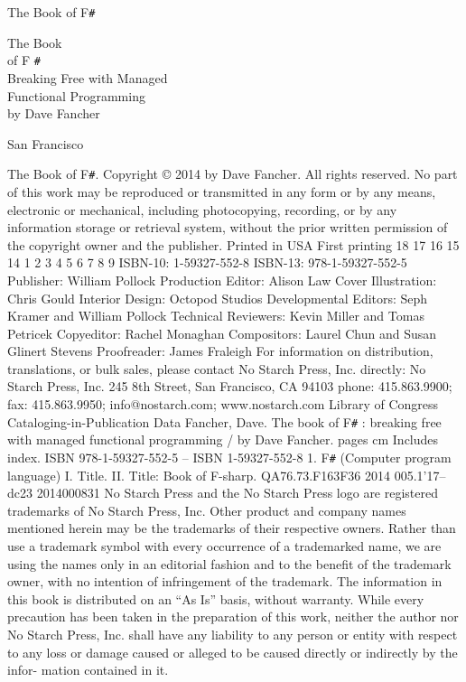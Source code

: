 \documentclass{book}
\begin{document}
The Book of F\verb|#|


\centering
{\Huge The Book \\of F \verb|#|\\}
{\large Breaking Free with Managed \\Functional Programming}
\\
{\large by Dave Fancher\\}


San Francisco

The Book of F\verb|#|. Copyright © 2014 by Dave Fancher.
All rights reserved. No part of this work may be reproduced or transmitted in any form or by any means, electronic
or mechanical, including photocopying, recording, or by any information storage or retrieval system, without the
prior written permission of the copyright owner and the publisher.
Printed in USA
First printing
18 17 16 15 14   1 2 3 4 5 6 7 8 9
ISBN-10: 1-59327-552-8
ISBN-13: 978-1-59327-552-5
Publisher: William Pollock
Production Editor: Alison Law
Cover Illustration: Chris Gould
Interior Design: Octopod Studios
Developmental Editors: Seph Kramer and William Pollock
Technical Reviewers: Kevin Miller and Tomas Petricek
Copyeditor: Rachel Monaghan
Compositors: Laurel Chun and Susan Glinert Stevens
Proofreader: James Fraleigh
For information on distribution, translations, or bulk sales, please contact No Starch Press, Inc. directly:
No Starch Press, Inc.
245 8th Street, San Francisco, CA 94103
phone: 415.863.9900; fax: 415.863.9950; info@nostarch.com; www.nostarch.com
Library of Congress Cataloging-in-Publication Data
Fancher, Dave.
The book of F\verb|#| : breaking free with managed functional programming / by Dave Fancher.
pages cm
Includes index.
ISBN 978-1-59327-552-5 -- ISBN 1-59327-552-8
1. F\verb|#| (Computer program language) I. Title. II. Title: Book of F-sharp.
QA76.73.F163F36 2014
005.1'17--dc23
2014000831
No Starch Press and the No Starch Press logo are registered trademarks of No Starch Press, Inc. Other product and
company names mentioned herein may be the trademarks of their respective owners. Rather than use a trademark
symbol with every occurrence of a trademarked name, we are using the names only in an editorial fashion and to
the benefit of the trademark owner, with no intention of infringement of the trademark.
The information in this book is distributed on an “As Is” basis, without warranty. While every precaution has been
taken in the preparation of this work, neither the author nor No Starch Press, Inc. shall have any liability to any
person or entity with respect to any loss or damage caused or alleged to be caused directly or indirectly by the infor-
mation contained in it.
\end{document}
